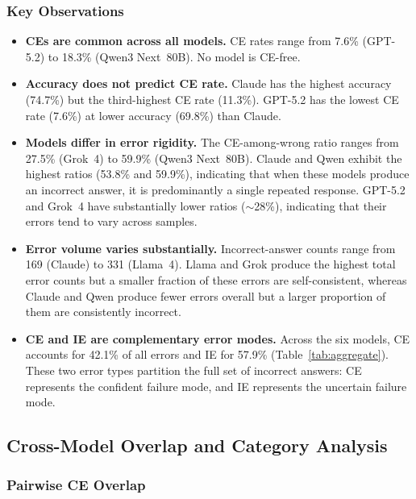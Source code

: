 \documentclass[12pt,twocolumn]{article}
\begin{document}
\subsubsection{Key Observations}

\begin{itemize}[nosep]
\item \textbf{CEs are common across all models.} CE rates range from
      7.6\% (GPT-5.2) to 18.3\% (Qwen3 Next~80B). No model is
      CE-free.
\item \textbf{Accuracy does not predict CE rate.} Claude has the
      highest accuracy (74.7\%) but the third-highest CE rate
      (11.3\%). GPT-5.2 has the lowest CE rate (7.6\%) at lower
      accuracy (69.8\%) than Claude.
\item \textbf{Models differ in error rigidity.}
      The CE-among-wrong ratio ranges from 27.5\% (Grok~4) to 59.9\%
      (Qwen3 Next~80B). Claude and Qwen exhibit the highest ratios
      (53.8\% and 59.9\%), indicating that when these models produce
      an incorrect answer, it is predominantly a single repeated
      response. GPT-5.2 and Grok~4 have substantially lower ratios
      ($\sim$28\%), indicating that their errors tend to vary across
      samples.
\item \textbf{Error volume varies substantially.} Incorrect-answer counts
      range from 169 (Claude) to 331 (Llama~4). Llama and Grok
      produce the highest total error counts but a smaller fraction of
      these errors are self-consistent, whereas Claude and Qwen produce
      fewer errors overall but a larger proportion of them are
      consistently incorrect.
\item \textbf{CE and IE are complementary error modes.} Across the six
      models, CE accounts for 42.1\% of all errors and IE for 57.9\%
      (Table~\ref{tab:aggregate}). These two error types partition the
      full set of incorrect answers: CE represents the confident
      failure mode, and IE represents the uncertain failure mode.
\end{itemize}

\subsection{Cross-Model Overlap and Category Analysis}
\label{sec:results-overlap}

\subsubsection{Pairwise CE Overlap}
\end{document}
